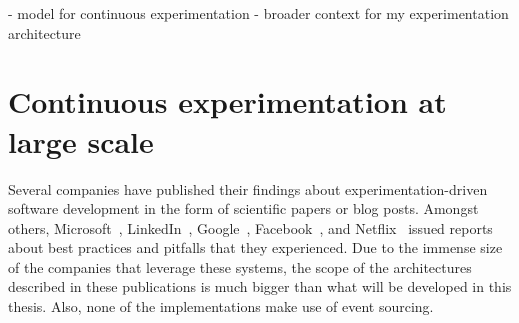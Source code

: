 \cite{Fagerholm2017}
- model for continuous experimentation
- broader context for my experimentation architecture

\section{Continuous experimentation at large scale}
\label{sec:related:large}

Several companies have published their findings about experimentation-driven software development in the form of scientific papers or blog posts.
Amongst others, Microsoft~\cite{Kohavi2013}, LinkedIn~\cite{Xu2015}, Google~\cite{Tang2010}, Facebook~\cite{Bakshy2014}, and Netflix~\cite{WEB:Netflix:2016} issued reports about best practices and pitfalls that they experienced.
Due to the immense size of the companies that leverage these systems, the scope of the architectures described in these publications is much bigger than what will be developed in this thesis.
Also, none of the implementations make use of event sourcing.
